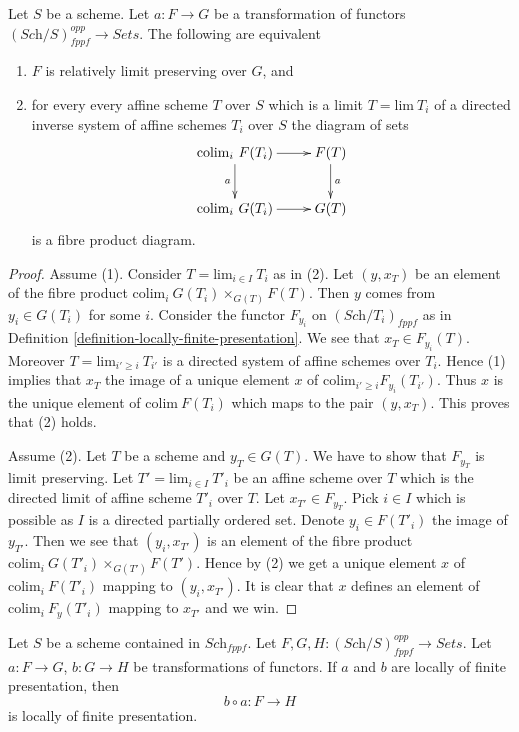 \begin{lemma}
\label{lemma-characterize-relative-limit-preserving}
Let $S$ be a scheme. Let $a : F \to G$ be a transformation of functors
$(\textit{Sch}/S)_{fppf}^{opp} \to \textit{Sets}$.
The following are equivalent
\begin{enumerate}
\item $F$ is relatively limit preserving over $G$, and
\item for every every affine scheme $T$ over $S$ which is a
limit $T = \text{lim}\ T_i$ of a directed inverse system of affine
schemes $T_i$ over $S$ the diagram of sets
$$
\xymatrix{
\text{colim}_i\ F(T_i) \ar[r] \ar[d]_a & F(T) \ar[d]^a \\
\text{colim}_i\ G(T_i) \ar[r] & G(T)
}
$$
is a fibre product diagram.
\end{enumerate}
\end{lemma}

\begin{proof}
Assume (1). Consider $T = \text{lim}_{i \in I}\ T_i$ as in (2). Let
$(y, x_T)$ be an element of the fibre product
$\text{colim}_i\ G(T_i) \times_{G(T)} F(T)$.
Then $y$ comes from $y_i \in G(T_i)$ for some $i$.
Consider the functor $F_{y_i}$ on $(\textit{Sch}/T_i)_{fppf}$ as in
Definition \ref{definition-locally-finite-presentation}.
We see that $x_T \in F_{y_i}(T)$. Moreover $T = \text{lim}_{i' \geq i}\ T_{i'}$
is a directed system of affine schemes over $T_i$. Hence (1) implies
that $x_T$ the image of a unique element $x$ of
$\text{colim}_{i' \geq i} F_{y_i}(T_{i'})$. Thus $x$ is the unique
element of $\text{colim}\ F(T_i)$ which maps to the pair $(y, x_T)$.
This proves that (2) holds.

\medskip\noindent
Assume (2). Let $T$ be a scheme and $y_T \in G(T)$. We have to show that
$F_{y_T}$ is limit preserving. Let $T' = \text{lim}_{i \in I}\ T'_i$ be an
affine scheme over $T$ which is the directed limit of affine scheme $T'_i$
over $T$. Let $x_{T'} \in F_{y_T}$. Pick $i \in I$ which is possible as
$I$ is a directed partially ordered set. Denote $y_i \in F(T'_i)$ the
image of $y_{T'}$. Then we see that $(y_i, x_{T'})$ is an
element of the fibre product 
$\text{colim}_i\ G(T'_i) \times_{G(T')} F(T')$.
Hence by (2) we get a unique element $x$ of $\text{colim}_i\ F(T'_i)$
mapping to $(y_i, x_{T'})$. It is clear that $x$ defines an element
of $\text{colim}_i\ F_y(T'_i)$ mapping to $x_{T'}$ and we win.
\end{proof}

\begin{lemma}
\label{lemma-composition-locally-finite-presentation}
Let $S$ be a scheme contained in $\textit{Sch}_{fppf}$.
Let $F, G, H : (\textit{Sch}/S)_{fppf}^{opp} \to \textit{Sets}$.
Let $a : F \to G$, $b : G \to H$ be transformations of functors.
If $a$ and $b$ are locally of finite presentation, then
$$
b \circ a : F \longrightarrow H
$$
is locally of finite presentation.
\end{lemma}

